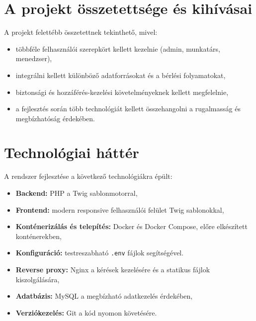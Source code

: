 \section{A projekt összetettsége és kihívásai}

A projekt felettébb összetettnek tekinthető, mivel:
\begin{itemize}
    \item többféle felhasználói szerepkört kellett kezelnie (admin, munkatárs, menedzser),
    \item integrálni kellett különböző adatforrásokat és a bérlési folyamatokat,
    \item biztonsági és hozzáférés-kezelési követelményeknek kellett megfelelnie,
    \item a fejlesztés során több technológiát kellett összehangolni a rugalmasság és megbízhatóság érdekében.
\end{itemize}

\section{Technológiai háttér}

A rendszer fejlesztése a következő technológiákra épült:
\begin{itemize}
    \item \textbf{Backend:} PHP a Twig sablonmotorral,
    \item \textbf{Frontend:} modern responsive felhasználói felület Twig sablonokkal,
    \item \textbf{Konténerizálás és telepítés:} Docker és Docker Compose, előre elkészített konténerekben,
    \item \textbf{Konfiguráció:} testreszabható \texttt{.env} fájlok segítségével.
    \item \textbf{Reverse proxy:} Nginx a kérések kezelésére és a statikus fájlok kiszolgálására,
    \item \textbf{Adatbázis:} MySQL a megbízható adatkezelés érdekében,
    \item \textbf{Verziókezelés:} Git a kód nyomon követésére.
\end{itemize}

